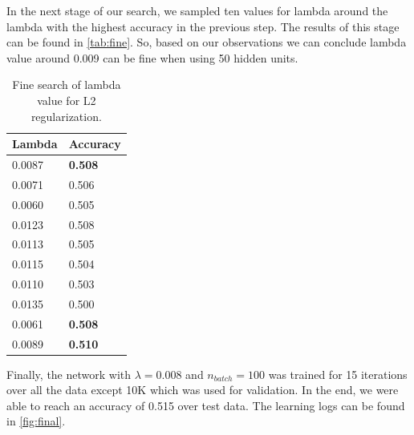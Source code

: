 \documentclass[a4paper]{article}
\begin{document}
In the next stage of our search, we sampled ten values for lambda around the lambda with the highest accuracy in the previous step. The results of this stage can be found in \autoref{tab:fine}. So, based on our observations we can conclude lambda value around 0.009 can be fine when using 50 hidden units.



\begin{table}[h]
	\centering
	\caption{Fine search of lambda value for L2 regularization.}
	\label{tab:fine}
	\begin{tabular}{|l|l|} 
		\hline
		Lambda & Accuracy  \\ 
		\hline
		0.0087 & \textbf{0.508}     \\ 
		\hline
		0.0071 & 0.506     \\ 
		\hline
		0.0060 & 0.505     \\ 
		\hline
		0.0123 & 0.508     \\ 
		\hline
		0.0113 & 0.505     \\ 
		\hline
		0.0115 & 0.504     \\ 
		\hline
		0.0110 & 0.503     \\ 
		\hline
		0.0135 & 0.500     \\ 
		\hline
		0.0061 & \textbf{0.508}     \\ 
		\hline
		0.0089 & \textbf{0.510}     \\
		\hline
	\end{tabular}
\end{table}


Finally, the network with $\lambda = 0.008$ and $n_{batch}=100$ was trained for 15 iterations over all the data except 10K which was used for validation. In the end, we were able to reach an accuracy of 0.515 over test data. The learning logs can be found in \autoref{fig:final}.
\end{document}

